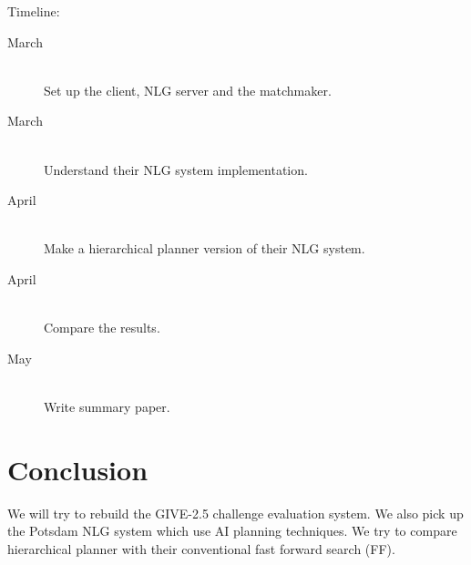 \documentclass[11pt]{article} %
\begin{document}
\noindent
Timeline:

\begin{description}
  \item[March] \hfill \\
  Set up the client, NLG server and the matchmaker.
  \item[March] \hfill \\
  Understand their NLG system implementation.
  \item[April] \hfill \\
  Make a hierarchical planner version of their NLG system.
  \item[April] \hfill \\
  Compare the results.
  \item[May] \hfill \\
  Write summary paper.
\end{description}

\section{Conclusion}
We will try to rebuild the GIVE-2.5 challenge evaluation system.
We also pick up the Potsdam NLG system which use AI planning techniques.
We try to compare hierarchical planner with their conventional fast forward search (FF). 




\end{document}
